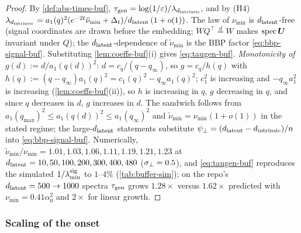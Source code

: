 \begin{proof}
By \cref{def:abs-times-buf}, $\tau_{\mathrm{gen}}=\log(1/\varepsilon)/\lambda_{d_{\mathrm{intrinsic}}}$, and by (H4) $\lambda_{d_{\mathrm{intrinsic}}}=a_1(q)^2(e^{-2t}\tilde\nu_{\min}+\Delta_t)/d_{\mathrm{latent}}\,(1+o(1))$. The law of $\nu_{\min}$ is $d_{\mathrm{latent}}$-free (signal coordinates are drawn before the embedding; $WQ^\top\overset d=W$ makes $\operatorname{spec}\bm{U}$ invariant under $Q$); the $d_{\mathrm{latent}}$-dependence of $\tilde\nu_{\min}$ is the BBP factor \eqref{eq:bbp-signal-buf}. Substituting \cref{lem:coeffs-buf}(i) gives \eqref{eq:taugen-buf}. \emph{Monotonicity of $g(d):=d/a_1(q(d))^2$}: $d=c_q/(q-q_\infty)$, so $g=c_q/h(q)$ with $h(q):=(q-q_\infty)a_1(q)^2=c_1(q)^2-q_\infty a_1(q)^2$; $c_1^2$ is increasing and $-q_\infty a_1^2$ is increasing (\cref{lem:coeffs-buf}(ii)), so $h$ is increasing in $q$, $g$ decreasing in $q$, and since $q$ decreases in $d$, $g$ increases in $d$. The sandwich follows from $a_1(q_{\max})^2\le a_1(q(d))^2\le a_1(q_\infty)^2$ and $\tilde\nu_{\min}=\nu_{\min}(1+o(1))$ in the stated regime; the large-$d_{\mathrm{latent}}$ statements substitute $\psi_\perp=(d_{\mathrm{latent}}-d_{\mathrm{intrinsic}})/n$ into \eqref{eq:bbp-signal-buf}. Numerically, $\tilde\nu_{\min}/\nu_{\min}=1.01,1.03,1.06,1.11,1.19,1.21,1.23$ at $d_{\mathrm{latent}}=10,50,100,200,300,400,480$ ($\sigma_{\perp}=0.5$), and \eqref{eq:taugen-buf} reproduces the simulated $1/\lambda^{\rm sig}_{\min}$ to $1$--$4\%$ (\cref{tab:buffer-sim}); on the repo's $d_{\mathrm{latent}}=500\to1000$ spectra $\tau_{\mathrm{gen}}$ grows $1.28\times$ versus $1.62\times$ predicted with $\nu_{\min}=0.41\alpha_0^2$ and $2\times$ for linear growth.
\end{proof}

\subsubsection{Scaling of the onset}


